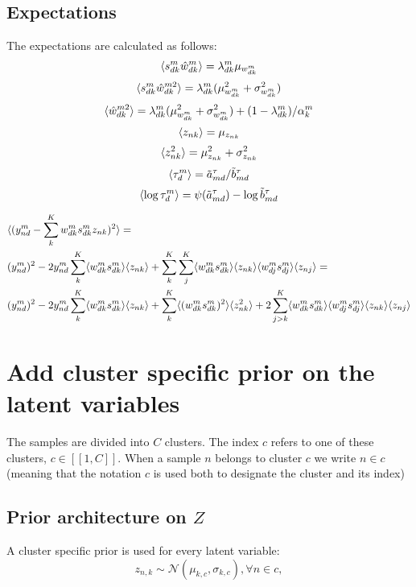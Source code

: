 \documentclass[10pt, a4paper,openany]{report}
\begin{document}
\subsection*{Expectations}
The expectations are calculated as follows:
\[
\langle s_{dk}^m \hat{w}_{dk}^m \rangle = \lambda_{dk}^m \mu_{w_{dk}^m}
\]
\[
\langle s_{dk}^m \hat{w}_{dk}^{m2} \rangle = \lambda_{dk}^m (\mu_{w_{dk}^m}^2 + \sigma_{w_{dk}^m}^2)
\]
\[
\langle \hat{w}_{dk}^{m2} \rangle = \lambda_{dk}^m(\mu_{w_{dk}^m}^2 + \sigma_{w_{dk}^m}^2) + (1-\lambda_{dk}^m)/\alpha_k^m
\]
\[
\langle z_{nk} \rangle = \mu_{z_{nk}}
\]
\[
\langle z_{nk}^2 \rangle = \mu_{z_{nk}}^2 + \sigma_{z_{nk}}^2
\]
\[
\langle \tau_d^m \rangle = \tilde{a}_{md}^\tau / \tilde{b}_{md}^\tau
\]
\[
\langle \log \tau_d^m \rangle = \psi(\tilde{a}_{md}^\tau) - \log \tilde{b}_{md}^\tau
\]

\begin{align*}
& \langle (y_{nd}^m - \sum_k^{K} w_{dk}^m s_{dk}^m z_{nk})^2 \rangle = \\
&(y_{nd}^m)^2 - 2y_{nd}^m \sum_k^{K} \langle w_{dk}^m s_{dk}^m \rangle \langle z_{nk} \rangle + \sum_k^{K}\sum_j^{K} \langle w_{dk}^m s_{dk}^m \rangle \langle z_{nk} \rangle \langle w_{dj}^m s_{dj}^m \rangle \langle z_{nj} \rangle = \\
&(y_{nd}^m)^2 - 2y_{nd}^m \sum_k^{K} \langle w_{dk}^m s_{dk}^m \rangle \langle z_{nk} \rangle + \sum_k^{K} \langle (w_{dk}^m s_{dk}^m)^2 \rangle \langle z_{nk}^2 \rangle + 2\sum_{j > k}^{K} \langle w_{dk}^m s_{dk}^m \rangle \langle w_{dj}^m s_{dj}^m \rangle \langle z_{nk} \rangle \langle z_{nj} \rangle
\end{align*}

\section{Add cluster specific prior on the latent variables}

The samples are divided into $C$ clusters. The index $c$ refers to one of these clusters, $c \in [[ 1, C]]$. When a sample $n$ belongs to cluster $c$ we write $n\in c$ (meaning that the notation $c$ is used both to designate the cluster and its index)

\subsection{Prior architecture on $Z$}
A cluster specific prior is used for every latent variable:
\begin{equation}
  z_{n, k} \sim \mathcal{N} (\mu_{k, c}, \sigma_{k, c}), \forall n\in c,
\end{equation}
\end{document}
